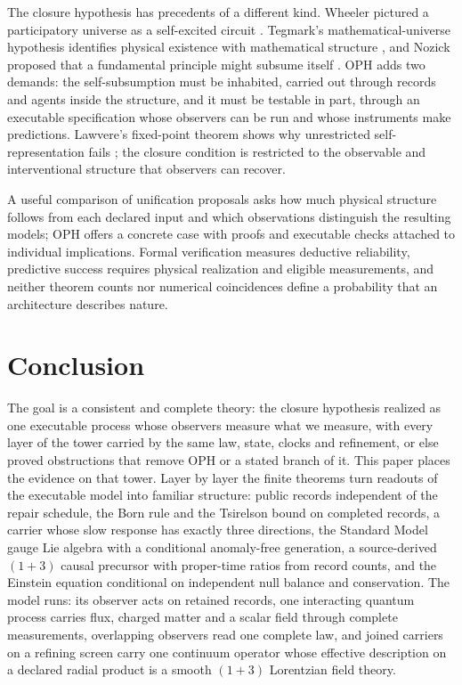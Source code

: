 \documentclass[11pt]{article}
\theoremstyle{definition}
\theoremstyle{remark}
\begin{document}
The closure hypothesis has precedents of a different kind. Wheeler pictured
a participatory universe as a self-excited circuit \cite{wheeler1983}.
Tegmark's mathematical-universe hypothesis identifies physical existence with
mathematical structure \cite{tegmark2008}, and Nozick proposed that a
fundamental principle might subsume itself \cite{nozick1981}. OPH adds two
demands: the self-subsumption must be inhabited, carried out through records
and agents inside the structure, and it must be testable in part, through an
executable specification whose observers can be run and whose instruments
make predictions. Lawvere's fixed-point theorem shows why unrestricted
self-representation fails \cite{lawvere1969}; the closure condition is
restricted to the observable and interventional structure that observers can
recover.

A useful comparison of unification proposals asks how much physical
structure follows from each declared input and which observations
distinguish the resulting models; OPH offers a concrete case with proofs and
executable checks attached to individual implications. Formal verification
measures deductive reliability, predictive success requires physical
realization and eligible measurements, and neither theorem counts nor
numerical coincidences define a probability that an architecture describes
nature.

\section{Conclusion}

The goal is a consistent and complete theory: the closure hypothesis
realized as one executable process whose observers measure what we measure,
with every layer of the tower carried by the same law, state, clocks and
refinement, or else proved obstructions that remove OPH or a stated branch
of it. This paper places the evidence on that tower. Layer by layer the
finite theorems turn readouts of the executable model into familiar
structure: public records independent of the repair schedule, the Born rule
and the Tsirelson bound on completed records, a carrier whose slow response
has exactly three directions, the Standard Model gauge Lie algebra with a
conditional anomaly-free generation, a source-derived $(1+3)$ causal
precursor with proper-time ratios from record counts, and the Einstein
equation conditional on independent null balance and conservation. The
model runs: its observer acts on retained records, one interacting quantum
process carries flux, charged matter and a scalar field through complete
measurements, overlapping observers read one complete law, and joined
carriers on a refining screen carry one continuum operator whose effective
description on a declared radial product is a smooth $(1+3)$ Lorentzian
field theory.
\end{document}
